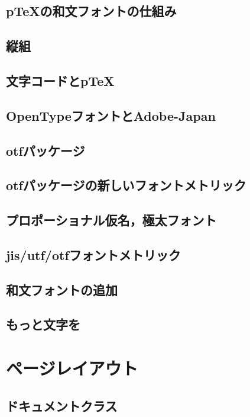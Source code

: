 \documentclass{jsbook}
\begin{document}
\section{p\TeX の和文フォントの仕組み}

\section{縦組}

\section{文字コードとp\TeX }

\section{OpenTypeフォントとAdobe-Japan}

\section{otfパッケージ}

\section{otfパッケージの新しいフォントメトリック}

\section{プロポーショナル仮名，極太フォント}

\section{jis/utf/otfフォントメトリック}

\section{和文フォントの追加}

\section{もっと文字を}

\chapter{ページレイアウト}

\section{ドキュメントクラス}
\end{document}

